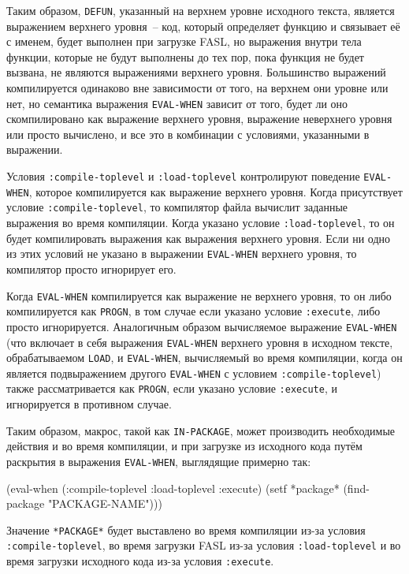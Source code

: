Таким образом, \lstinline{DEFUN}, указанный на верхнем уровне исходного текста, является
выражением верхнего уровня~-- код, который определяет функцию и связывает её с именем,
будет выполнен при загрузке FASL, но выражения внутри тела функции, которые не будут
выполнены до тех пор, пока функция не будет вызвана, не являются вы\-ра\-же\-ния\-ми верхнего
уровня.  Большинство выражений компилируется одинаково вне зависимости от того, на верхнем
они уровне или нет, но семантика выражения \lstinline{EVAL-WHEN} зависит от того, будет ли
оно скомпилировано как выражение верхнего уровня, выражение неверхнего уровня или просто
вычислено, и все это в комбинации с условиями, указанными в выражении.

Условия \lstinline{:compile-toplevel} и \lstinline{:load-toplevel} контролируют поведение
\lstinline{EVAL-WHEN}, которое компилируется как выражение верхнего уровня.  Когда присутствует
условие \lstinline{:compile-toplevel}, то компилятор файла вычислит заданные выражения во время
компиляции.  Когда указано условие \lstinline{:load-toplevel}, то он будет компилировать
выражения как выражения верхнего уровня.  Если ни одно из этих условий не указано в
выражении \lstinline{EVAL-WHEN} верхнего уровня, то компилятор просто игнорирует его.

Когда \lstinline{EVAL-WHEN} компилируется как выражение не верхнего уровня, то он либо
компилируется как \lstinline{PROGN}, в том случае если указано условие
\lstinline{:execute}, либо просто игнорируется.  Аналогичным образом вычисляемое
выражение \lstinline{EVAL-WHEN} (что включает в себя выражения \lstinline{EVAL-WHEN}
верхнего уровня в исходном тексте, обрабатываемом \lstinline{LOAD}, и
\lstinline{EVAL-WHEN}, вычисляемый во время компиляции, когда он является подвыражением
другого \lstinline{EVAL-WHEN} с условием \lstinline{:compile-toplevel}) также
рассматривается как \lstinline{PROGN}, если указано условие \lstinline{:execute}, и
игнорируется в противном случае.

Таким образом, макрос, такой как \lstinline{IN-PACKAGE}, может производить необходимые действия
и во время компиляции, и при загрузке из исходного кода путём раскрытия в выражения
\lstinline{EVAL-WHEN}, выглядящие примерно так:

\begin{myverb}
(eval-when (:compile-toplevel :load-toplevel :execute)
  (setf *package* (find-package "PACKAGE-NAME")))
\end{myverb}

Значение \lstinline{*PACKAGE*} будет выставлено во время компиляции из-за условия
\lstinline{:compile-toplevel}, во время загрузки FASL из-за условия \lstinline{:load-toplevel} и во
время загрузки исходного кода из-за условия \lstinline{:execute}.

